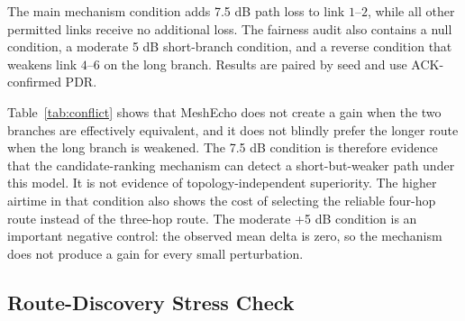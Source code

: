 \documentclass[conference]{IEEEtran}
\begin{document}
The main mechanism condition adds 7.5 dB path loss to link $1$--$2$, while all
other permitted links receive no additional loss. The fairness audit also
contains a null condition, a moderate 5 dB short-branch condition, and a
reverse condition that weakens link $4$--$6$ on the long branch. Results are
paired by seed and use ACK-confirmed PDR.

\begin{table}[t]
\centering
\caption{Controlled route-conflict fairness audit. Values are means over 100
paired seeds. The selected-route columns report the fraction of runs selecting
the indicated route class.}
\label{tab:conflict}
\scriptsize
\setlength{\tabcolsep}{3pt}
\end{table}

Table~\ref{tab:conflict} shows that MeshEcho does not create a gain when the
two branches are effectively equivalent, and it does not blindly prefer the
longer route when the long branch is weakened. The 7.5 dB condition is
therefore evidence that the candidate-ranking mechanism can detect a
short-but-weaker path under this model. It is not evidence of
topology-independent superiority. The higher airtime in that condition also
shows the cost of selecting the reliable four-hop route instead of the
three-hop route. The moderate +5 dB condition is an important negative control:
the observed mean delta is zero, so the mechanism does not produce a gain for
every small perturbation.

\subsection{Route-Discovery Stress Check}
\end{document}
